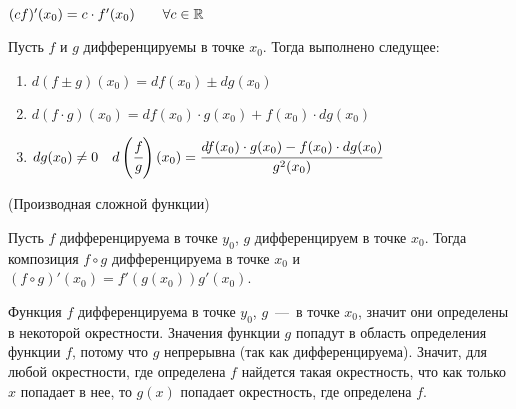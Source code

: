 \begin{corollary}
    $ (cf)'(x_{0}) = c\cdot f'(x_{0}) \quad \quad \forall c \in \mathbb{R}
    $
\end{corollary}
\begin{corollary}
    Пусть $f$ и $g$ дифференцируемы в точке $x_{0}$. Тогда выполнено следущее:
    \begin{enumerate}
        \item $  d(f \pm g)(x_{0}) = df(x_{0}) \pm dg({x_{0}}) $
        \item  $ d(f \cdot g)(x_{0}) = df(x_{0}) \cdot g({x_{0}}) + f(x_{0}) \cdot dg({x_{0}})$
        \item $dg(x_{0}) \neq 0 \quad d\left(\cfrac{f}{g}\right) (x_{0}) = \cfrac{df(x_{0}) \cdot g({x_{0}}) - f(x_{0}) \cdot dg({x_{0}})}{g^{2}(x_{0})}$
    \end{enumerate}
\end{corollary}
\begin{theorem}
    \hypertarget{thrm5.10}{(Производная сложной функции)} Пусть $f$ дифференцируема в точке $y_{0}$, $g$ дифференцируем в точке $x_{0}$. Тогда композиция $f \circ g$ дифференцируема в точке $x_{0} $ и $(f\circ g)'(x_{0}) = f'(g(x_{0})) g'(x_{0})$.
\end{theorem}
\begin{note}
     Функция $f$ дифференцируема в точке $y_{0}$, $g$~---~в точке $x_{0}$, значит они определены в некоторой окрестности. Значения функции $g$ попадут в область определения функции $f$, потому что $g$ непрерывна (так как дифференцируема). Значит, для любой окрестности, где определена $f$ найдется такая окрестность, что как только $x$ попадает в нее, то $g(x)$ попадает окрестность, где определена $f$.
\end{note}
